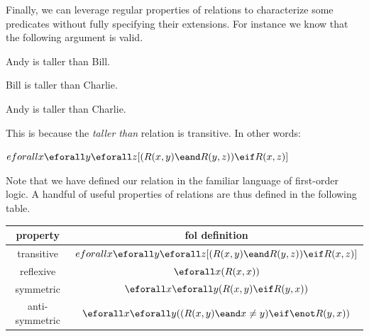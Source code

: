 
Finally, we can leverage regular properties of relations to characterize some
predicates without fully specifying their extensions. For instance we know
that the following argument is valid.

\begin{argument}
\item[ ] Andy is taller than Bill.
\item[ ] Bill is taller than Charlie.
\item[\therefore] Andy is taller than Charlie. 
\end{argument}

This is because the \emph{taller than} relation is transitive. In other words:

\begin{example}
  $eforall x\eforall y\eforall z[(R(x,y)\eand R(y,z))\eif R(x,z)]$
\end{example}

Note that we have defined our relation in the familiar language of first-order
logic. A handful of useful properties of relations are thus defined in the
following table.

\begin{center}
  \begin{tabular}{c c}
    property & fol definition \\
    \hline
    transitive      &
    $eforall x\eforall y\eforall z[(R(x,y)\eand R(y,z))\eif R(x,z)]$\\
    reflexive       &
    $\eforall x(R(x,x))$ \\
    symmetric       &
    $\eforall x\eforall y(R(x,y)\eif R(y,x))$ \\
    anti-symmetric  &
    $\eforall x\eforall y((R(x,y)\eand x\neq y)\eif\enot R(y,x))$ \\
  \end{tabular}
\end{center}

